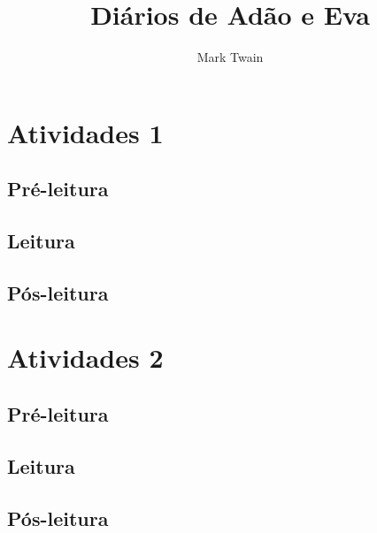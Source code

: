 \documentclass{extarticle}
\begin{document}
\newcommand{\AutorLivro}{Mark Twain}
\newcommand{\TituloLivro}{Diários de Adão e Eva}
\newcommand{\Tema}{Ficção, mistério e fantasia}
\newcommand{\Genero}{Conto, crônica e novela}
\newcommand{\issnppub}{---}
\newcommand{\issnepub}{---}
\newcommand{\colaborador}{\textbf{Fulano de Tal} é uma pessoa incrível e vai fazer um bom serviço.}


\title{\TituloLivro}
\author{\AutorLivro}
\def\authornotes{\colaborador}

\date{}
\maketitle
\tableofcontents




\section{Atividades 1}


\subsection{Pré-leitura}
\subsection{Leitura}
\subsection{Pós-leitura}



\section{Atividades 2}

\subsection{Pré-leitura}
\subsection{Leitura}
\subsection{Pós-leitura}

\lipsum
\end{document}
